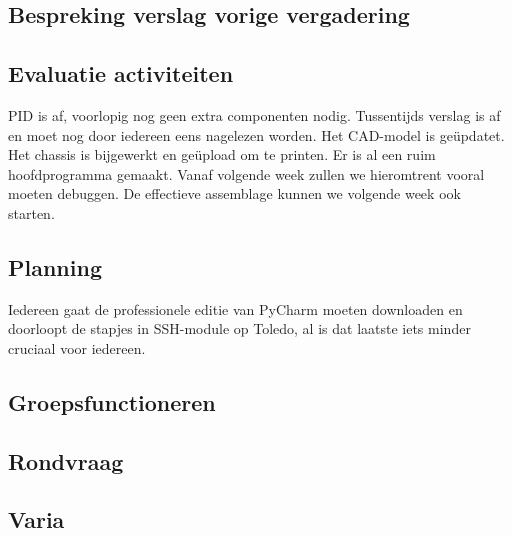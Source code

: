 \documentclass[a4paper,kulak]{kulakarticle} %
\begin{document}
\subsection{Bespreking verslag vorige vergadering}

\subsection{Evaluatie activiteiten}
PID is af, voorlopig nog geen extra componenten nodig. Tussentijds verslag is af en moet nog door iedereen eens nagelezen worden. Het CAD-model is geüpdatet. Het chassis is bijgewerkt en geüpload om te printen. Er is al een ruim hoofdprogramma gemaakt. Vanaf volgende week zullen we hieromtrent vooral moeten debuggen. De effectieve assemblage kunnen we volgende week ook starten.

\subsection{Planning}
Iedereen gaat de professionele editie van PyCharm moeten downloaden en doorloopt de stapjes in SSH-module op Toledo, al is dat laatste iets minder cruciaal voor iedereen. 
\subsection{Groepsfunctioneren}
\subsection{Rondvraag}
\subsection{Varia}
\end{document}
